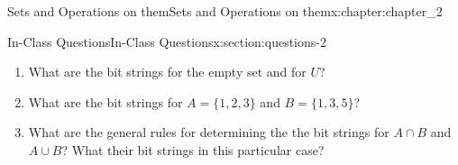 \documentclass[oneside,10pt,]{book}
\numberwithin{equation}{section}
\begin{document}
\begin{chapterptx}{Sets and Operations on them}{}{Sets and Operations on them}{}{}{x:chapter:chapter_2}
\begin{sectionptx}{In-Class Questions}{}{In-Class Questions}{}{}{x:section:questions-2}
\begin{enumerate}[label=\arabic*.]
\begin{enumerate}[label=(\alph*)]
\item{}What are the bit strings for the empty set and for \(U\)?%
\item{}What are the bit strings for \(A=\{1,2,3\}\) and \(B=\{1,3,5\}\)?%
\item{}What are the general rules for determining the the bit strings for \(A\cap B\) and \(A \cup B\)?  What their bit strings in this particular case?%
\end{enumerate}
%
\end{enumerate}
%
\end{sectionptx}
\end{chapterptx}
%
%
\typeout{************************************************}
\typeout{************************************************}
%
\end{document}
